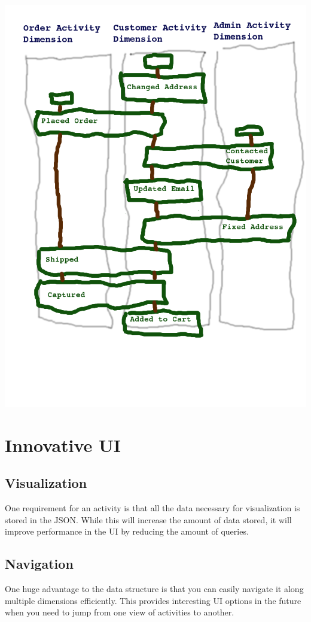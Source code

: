 \documentclass[11pt]{article}
\begin{document}
\includegraphics[scale=0.40]{dimension}

\section{Innovative UI}
\subsection{Visualization}

One requirement for an activity is that all the data necessary for visualization is stored
in the JSON. While this will increase the amount of data stored, it will improve performance
in the UI by reducing the amount of queries. 

\subsection{Navigation}

One huge advantage to the data structure is that you can easily navigate it along multiple
dimensions efficiently. This provides interesting UI options in the future when you need
to jump from one view of activities to another.
\end{document}
